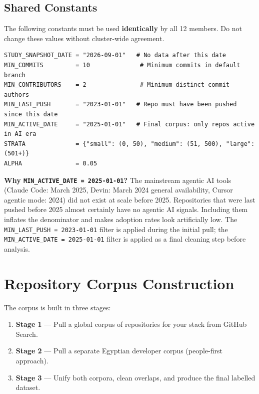 \documentclass[11pt,a4paper]{article}
\begin{document}
\subsection{Shared Constants}

The following constants must be used \textbf{identically} by all 12 members. Do not change these values without cluster-wide agreement.

\begin{lstlisting}
STUDY_SNAPSHOT_DATE = "2026-09-01"   # No data after this date
MIN_COMMITS         = 10              # Minimum commits in default branch
MIN_CONTRIBUTORS    = 2               # Minimum distinct commit authors
MIN_LAST_PUSH       = "2023-01-01"   # Repo must have been pushed since this date
MIN_ACTIVE_DATE     = "2025-01-01"   # Final corpus: only repos active in AI era
STRATA              = {"small": (0, 50), "medium": (51, 500), "large": (501+)}
ALPHA               = 0.05
\end{lstlisting}

\textbf{Why \texttt{MIN\_ACTIVE\_DATE = 2025-01-01}?} The mainstream agentic AI tools (Claude Code: March 2025, Devin: March 2024 general availability, Cursor agentic mode: 2024) did not exist at scale before 2025. Repositories that were last pushed before 2025 almost certainly have no agentic AI signals. Including them inflates the denominator and makes adoption rates look artificially low. The \texttt{MIN\_LAST\_PUSH = 2023-01-01} filter is applied during the initial pull; the \texttt{MIN\_ACTIVE\_DATE = 2025-01-01} filter is applied as a final cleaning step before analysis.

\section{Repository Corpus Construction}

The corpus is built in three stages:

\begin{enumerate}
    \item \textbf{Stage 1} — Pull a global corpus of repositories for your stack from GitHub Search.
    \item \textbf{Stage 2} — Pull a separate Egyptian developer corpus (people-first approach).
    \item \textbf{Stage 3} — Unify both corpora, clean overlaps, and produce the final labelled dataset.
\end{enumerate}
\end{document}
